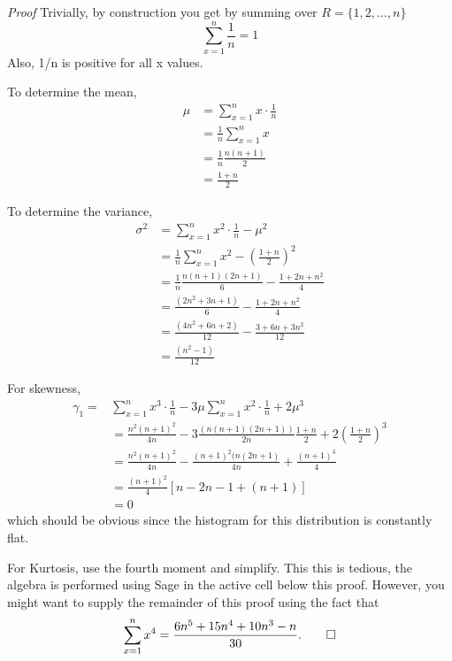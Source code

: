 \documentclass[10pt,]{book}
\makeatletter
\renewcommand*{\proofname}{Proof}
\renewenvironment{proof}[1][\proofname]{\par
  \pushQED{\qed}%
  \normalfont \topsep6\p@\@plus6\p@\relax
  \trivlist
  \item\relax
    {\itshape
    #1\@addpunct{.}}\hspace\labelsep\ignorespaces
}{%
  \popQED\endtrivlist\@endpefalse
}
\numberwithin{equation}{section}
\makeatother
\begin{document}
\begin{proof}\hypertarget{proof-34}{}
\hypertarget{p-799}{}%
Trivially, by construction you get by summing over \(R = \{1, 2, ... , n \}\)%
\begin{equation*}
\sum_{x=1}^n \frac{1}{n} = 1
\end{equation*}
Also, 1/n is positive for all x values.%
\par
\hypertarget{p-800}{}%
To determine the mean,%
\begin{align*}
\mu & = \sum_{x=1}^n x \cdot \frac{1}{n}\\
& = \frac{1}{n}\sum_{x=1}^n x \\
& = \frac{1}{n} \frac{n(n+1)}{2}\\
& = \frac{1+n}{2}
\end{align*}
%
\par
\hypertarget{p-801}{}%
To determine the variance,%
\begin{align*}
\sigma^2 & = \sum_{x=1}^n x^2 \cdot \frac{1}{n} - \mu^2\\
& = \frac{1}{n}\sum_{x=1}^n x^2 - \left ( \frac{1+n}{2}\right )^2 \\
& = \frac{1}{n} \frac{n(n+1)(2n+1)}{6} - \frac{1+2n+n^2}{4}\\
& = \frac{(2n^2+3n+1)}{6} - \frac{1+2n+n^2}{4}\\
& = \frac{(4n^2+6n+2)}{12} - \frac{3+6n+3n^2}{12}\\
& = \frac{(n^2-1)}{12}
\end{align*}
%
\par
\hypertarget{p-802}{}%
For skewness,%
\begin{align*}
\gamma_1 = & \sum_{x=1}^n x^3 \cdot \frac{1}{n} - 3 \mu \sum_{x=1}^n x^2 \cdot \frac{1}{n}  + 2\mu^3\\
& = \frac{n^2(n+1)^2}{4n} - 3\frac{(n(n+1)(2n+1))}{2n} \frac{1+n}{2} + 2 \left ( \frac{1+n}{2}\right )^3 \\
& = \frac{n^2(n+1)^2}{4n} - \frac{(n+1)^2 (n(2n+1)}{4n} + \frac{(n+1)^3}{4}\\
& = \frac{(n+1)^2}{4} \left [ n - 2n -1 + (n+1) \right ]\\
& = 0
\end{align*}
which should be obvious since the histogram for this distribution is constantly flat.%
\par
\hypertarget{p-803}{}%
For Kurtosis, use the fourth moment and simplify.  This this is tedious, the algebra is performed using Sage in the active cell below this proof. However, you might want to supply the remainder of this proof using the fact that%
\begin{equation*}
\sum_{x=1}^n x^4 = \frac{6n^5 + 15n^4 + 10n^3 - n}{30}.\qedhere
\end{equation*}
%
\end{proof}
\end{document}
